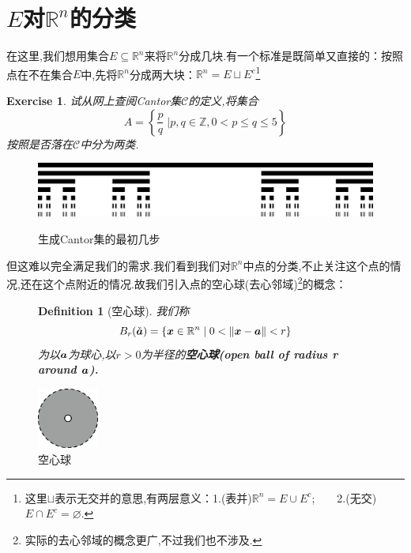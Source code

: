 \documentclass[12pt,A4paper,oneside]{amsart}
\numberwithin{equation}{section}
\theoremstyle{plain}
\newtheorem{defn}[theorem]{Definition}
\theoremstyle{plain}
\newtheorem{exercise}{Exercise}[section]
\theoremstyle{plain}
\numberwithin{equation}{section}
\theoremstyle{remark}
\newcommand*{\thick}[1]{\text{\boldmath$#1$}}
\newcommand*{\norm}[1]{\lVert#1\rVert}
\begin{document}
\section{$E$对$\mathbb{R}^n$的分类}
在这里,我们想用集合$E \subseteq \mathbb{R}^n$来将$\mathbb{R}^n$分成几块.有一个标准是既简单又直接的：按照点在不在集合$E$中,先将$\mathbb{R}^n$分成两大块：$\mathbb{R}^n=E \sqcup E^c$\footnote{这里$\sqcup$表示无交并的意思,有两层意义：1.(表并)$\mathbb{R}^n=E \cup E^c$;$\qquad$2.(无交)$E \cap E^c = \varnothing$.}

\begin{exercise}
	\label{exer:cantorset}
	试从网上查阅Cantor集$\mathcal{C}$的定义,将集合$$A=\left\{\frac{p}{q}\;\bigg| p,q \in \mathbb{Z}, 0 < p \leqslant q \leqslant 5 \right\}$$按照是否落在$\mathcal{C}$中分为两类.
\end{exercise}
\begin{figure}[th]
	\centering
	\includegraphics[width=\textwidth]{figures/Cantor_set.jpg}\\
	\caption{生成Cantor集的最初几步}
\end{figure}
但这难以完全满足我们的需求.我们看到我们对$\mathbb{R}^n$中点的分类,不止关注这个点的情况,还在这个点附近的情况.故我们引入点的空心球(去心邻域)\footnote{实际的去心邻域的概念更广,不过我们也不涉及.}的概念：


	\begin{figure}[ht]
		\begin{minipage}[b]{.65\textwidth}
			\begin{defn}[空心球]
				我们称
			$$B_r(\check{\thick{a}})=\{\thick{x} \in \mathbb{R}^n \mid 0 < \norm{\thick{x}-\thick{a}} <r\}$$
			为以$\thick{a}$为球心,以$r>0$为半径的\bfseries{空心球(open ball of radius r around $\thick{a}$)}.
			\end{defn}
		\end{minipage}
		\begin{minipage}[b]{.33\textwidth}
			\centering
			\includegraphics[width=2cm]{figures/figure3.png}
			\caption{空心球}
		\end{minipage}
		
	\end{figure}
\end{document}
